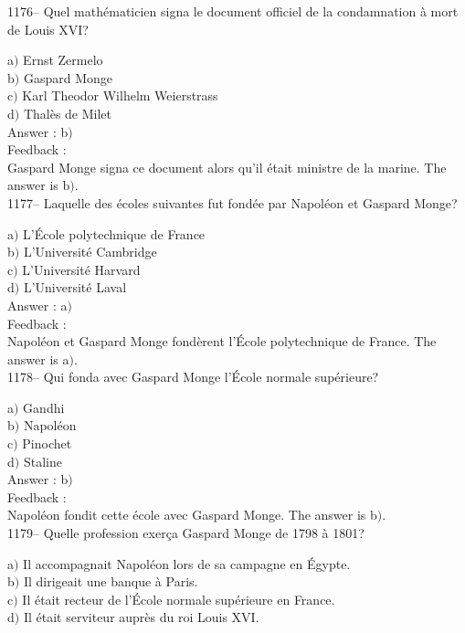 \documentclass[letterpaper, 12pt]{article}
\begin{document}
1176-- Quel math\'ematicien signa le document officiel de la
condamnation \`a mort de Louis XVI?

a$)$ Ernst Zermelo \\
b$)$ Gaspard Monge \\
c$)$ Karl Theodor Wilhelm Weierstrass  \\
d$)$ Thal\`es de Milet\\

Answer : b$)$\\

Feedback : \\
Gaspard Monge signa ce document alors qu'il \'etait ministre de la
marine.
The answer is b$)$.\\

1177-- Laquelle des \'ecoles suivantes fut fond\'ee par Napol\'eon
et Gaspard Monge?

a$)$ L'\'Ecole polytechnique de France \\
b$)$ L'Universit\'e Cambridge \\
c$)$ L'Universit\'e Harvard \\
d$)$ L'Universit\'e Laval\\

Answer : a$)$\\

Feedback : \\
Napol\'eon et Gaspard Monge fond\`erent l'\'Ecole polytechnique de
France.
The answer is a$)$.\\

1178-- Qui fonda avec Gaspard Monge l'\'Ecole normale sup\'erieure?

a$)$ Gandhi \\
b$)$ Napol\'eon \\
c$)$ Pinochet \\
d$)$ Staline\\

Answer : b$)$\\

Feedback : \\
Napol\'eon fondit cette \'ecole avec Gaspard Monge.
The answer is b$)$.\\

1179-- Quelle profession exer\c ca Gaspard Monge de 1798 \`a 1801?

a$)$ Il accompagnait Napol\'eon lors de sa campagne en \'Egypte. \\
b$)$ Il dirigeait une banque \`a Paris. \\
c$)$ Il \'etait recteur de l'\'Ecole normale sup\'erieure en France. \\
d$)$ Il \'etait serviteur aupr\`es du roi Louis XVI. \\
\end{document}
